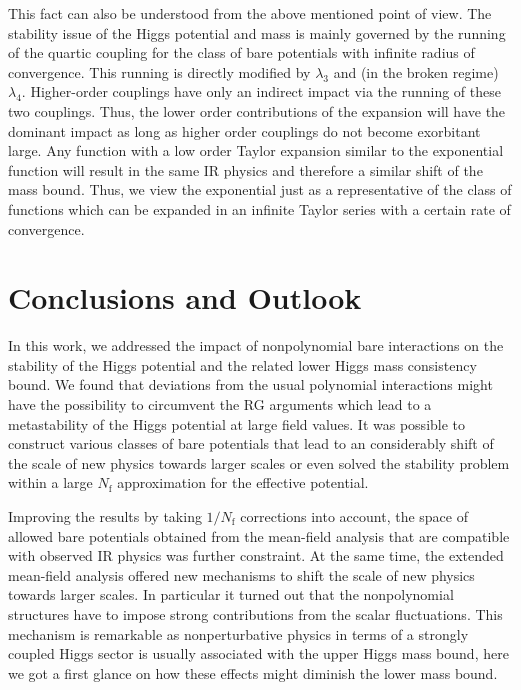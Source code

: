 \documentclass[twocolumn,aps,prd,showpacs,nofootinbib,superscriptaddress,preprintnumbers,floatfix,10pt]{revtex4-1}
\newcommand{\Nf}{N_{\mathrm{f}}}
\begin{document}
This fact can also be understood from the above mentioned point of view.
The stability issue of the Higgs potential and mass is mainly governed by the running of the quartic coupling for the class of bare potentials with infinite radius of convergence. This running is directly modified by $\lambda_{3}$ and (in the broken regime) $\lambda_{4}$. Higher-order couplings have only an indirect impact via the running of these two couplings. Thus, the lower order contributions of the expansion will have the dominant impact as long as higher order couplings do not become exorbitant large. Any function with a low order Taylor expansion similar to the exponential function will result in the same IR physics and therefore a similar shift of the mass bound. Thus, we view the exponential just as a representative of the class of functions which can be expanded in an infinite Taylor series with a certain rate of convergence.















\section{Conclusions and Outlook}
\label{sec:Con}

In this work, we addressed the impact of nonpolynomial bare interactions on the stability of the Higgs potential and the related lower Higgs mass consistency bound. 
We found that deviations from the usual polynomial interactions might have the possibility to circumvent the RG arguments which lead to a metastability of the Higgs potential at large field values. 
It was possible to construct various classes of bare potentials that lead to an considerably shift of the scale of new physics towards larger scales or even solved the stability problem within a large $\Nf$ approximation for the effective potential. 

Improving the results by taking $1/\Nf$ corrections into account, the space of allowed bare potentials obtained from the mean-field analysis that are compatible with observed IR physics was further constraint. 
At the same time, the extended mean-field analysis offered new mechanisms to shift the scale of new physics towards larger scales.
In particular it turned out that the nonpolynomial structures have to impose strong contributions from the scalar fluctuations. 
This mechanism is remarkable as nonperturbative physics in terms of a strongly coupled Higgs sector is usually associated with the upper Higgs mass bound, here we got a first glance on how these effects might diminish the lower mass bound.
\end{document}
